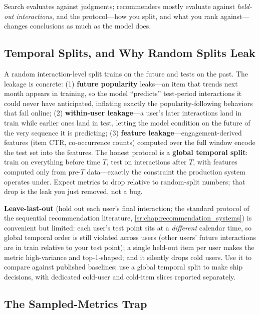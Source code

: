 Search evaluates against judgments; recommenders mostly evaluate against \textit{held-out interactions}, and the protocol---how you split, and what you rank against---changes conclusions as much as the model does.

\subsection{Temporal Splits, and Why Random Splits Leak}

A random interaction-level split trains on the future and tests on the past. The leakage is concrete: (1) \textbf{future popularity} leaks---an item that trends next month appears in training, so the model ``predicts'' test-period interactions it could never have anticipated, inflating exactly the popularity-following behaviors that fail online; (2) \textbf{within-user leakage}---a user's later interactions land in train while earlier ones land in test, letting the model condition on the future of the very sequence it is predicting; (3) \textbf{feature leakage}---engagement-derived features (item CTR, co-occurrence counts) computed over the full window encode the test set into the features. The honest protocol is a \textbf{global temporal split}: train on everything before time $T$, test on interactions after $T$, with features computed only from pre-$T$ data---exactly the constraint the production system operates under. Expect metrics to drop relative to random-split numbers; that drop is the leak you just removed, not a bug.

\textbf{Leave-last-out} (hold out each user's final interaction; the standard protocol of the sequential recommendation literature, \ref{sr:chap:recommendation_systems}) is convenient but limited: each user's test point sits at a \textit{different} calendar time, so global temporal order is still violated across users (other users' future interactions are in train relative to your test point); a single held-out item per user makes the metric high-variance and top-1-shaped; and it silently drops cold users. Use it to compare against published baselines; use a global temporal split to make ship decisions, with dedicated cold-user and cold-item slices reported separately.

\subsection{The Sampled-Metrics Trap}

